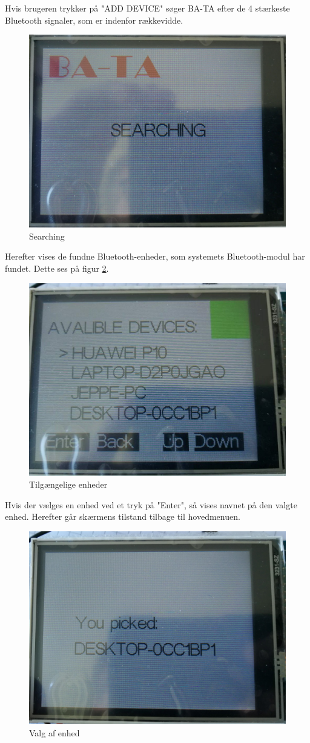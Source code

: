 Hvis brugeren trykker på "ADD DEVICE" søger BA-TA efter de 4 stærkeste Bluetooth signaler, som er indenfor rækkevidde. 
\begin{figure}[H]
	\centering
	\includegraphics[width = 300 pt]{Img/Searching.jpg}
	\caption{Searching}
	\label{fig:Searching}
\end{figure}
Herefter vises de fundne Bluetooth-enheder, som systemets Bluetooth-modul har fundet. Dette ses på figur \ref{fig:devices}.
\begin{figure}[H]
	\centering
	\includegraphics[width = 300 pt]{Img/devices.jpg}
	\caption{Tilgængelige enheder}
	\label{fig:devices}
\end{figure}
Hvis der vælges en enhed ved et tryk på "Enter", så vises navnet på den valgte enhed. Herefter går skærmens tilstand tilbage til hovedmenuen. 
\begin{figure}[H]
	\centering
	\includegraphics[width = 300 pt]{Img/pick.jpg}
	\caption{Valg af enhed}
	\label{fig:pick}
\end{figure}
